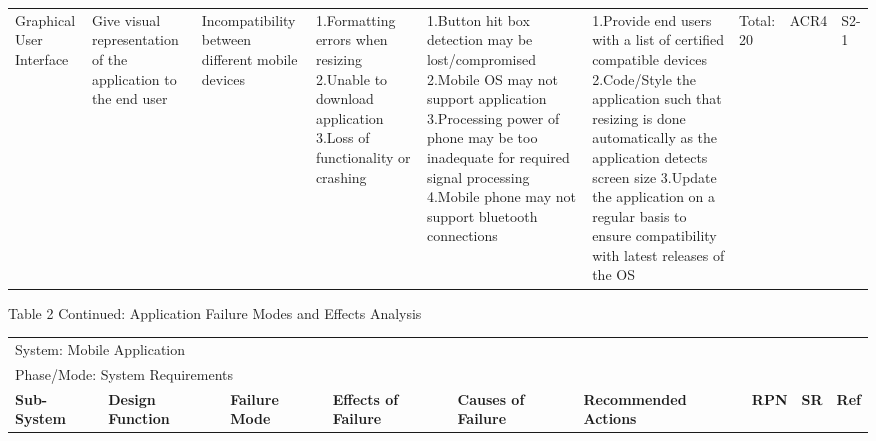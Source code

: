 \documentclass[12pt, titlepage]{article}
\begin{document}
\begin{landscape}
\begin{table}[H]
\begin{tabular}{| p{} | p{}  | p{} | p{} | p{} | p{} | p{} | p{} | p{} |}
    Graphical User Interface & Give visual representation of the application to the end user & Incompatibility between different mobile devices  & 1.Formatting errors when resizing \newline 2.Unable to download application \newline 3.Loss of functionality or crashing & 1.Button hit box detection may be lost/compromised \newline 2.Mobile OS may not support application \newline 3.Processing power of phone may be too  inadequate for required signal processing \newline 4.Mobile phone may not support bluetooth connections  & 1.Provide end users with a list of certified compatible devices \newline 2.Code/Style the application such that resizing is done automatically as the application detects screen size \newline 3.Update the application on a regular basis to ensure compatibility with latest releases of the OS  & Total: 20 & ACR4 & S2-1 \\ \cline{1-9}

    \end{tabular}
    
\end{table}

\begin{table}[H]

    Table 2 Continued: Application Failure Modes and Effects Analysis	
    \centering
    
    \begin{tabular}{| p{} | p{}  | p{} | p{} | p{} | p{} | p{} | p{} | p{} |}
     \hline
    
    \multicolumn{9}{|l|}{System: Mobile Application } \\
    \multicolumn{9}{|l|}{Phase/Mode: System Requirements} \\ \hline
    \textbf{Sub-System} & \textbf{Design Function} & \textbf{Failure Mode} & \textbf{Effects of Failure} & \textbf{Causes of Failure} & \textbf{Recommended Actions} & \textbf{RPN} & \textbf{SR} & \textbf{Ref} \\ \hline


\end{tabular}
\end{table}
\end{landscape}
\end{document}
